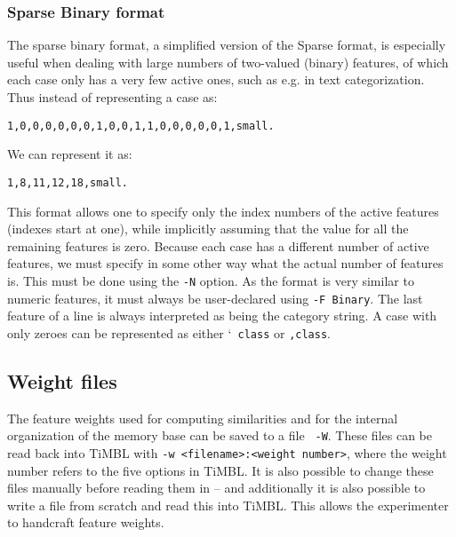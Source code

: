 \documentclass{report}
\begin{document}
\subsubsection{Sparse Binary format}
\label{binaryformat}

The sparse binary format, a simplified version of the Sparse format,
is especially useful when dealing with large numbers of two-valued
(binary) features, of which each case only has a very few active ones,
such as e.g. in text categorization. Thus instead of representing a
case as:

\begin{footnotesize}
\begin{verbatim}
1,0,0,0,0,0,0,1,0,0,1,1,0,0,0,0,0,1,small.
\end{verbatim}
\end{footnotesize}

We can represent it as:

\begin{footnotesize}
\begin{verbatim}
1,8,11,12,18,small.
\end{verbatim}
\end{footnotesize}

This format allows one to specify only the index numbers of the active
features (indexes start at one), while implicitly assuming that the
value for all the remaining features is zero. Because each case has a
different number of active features, we must specify in some other way
what the actual number of features is. This must be done using the
{\tt -N} option.  As the format is very similar to numeric features,
it must always be user-declared using {\tt -F Binary}. The last
feature of a line is always interpreted as being the category
string. A case with only zeroes can be represented as either `{\tt
class} or {\tt ,class}.

\subsection{Weight files}
\label{weightformat}

The feature weights used for computing similarities and for the
internal organization of the memory base can be saved to a file {\tt
  -W}. These files can be read back into TiMBL with {\tt -w
  <filename>:<weight number>}, where the weight number refers to the
five options in TiMBL. It is also possible to change these files
manually before reading them in -- and additionally it is also
possible to write a file from scratch and read this into TiMBL. This
allows the experimenter to handcraft feature weights.
\end{document}
